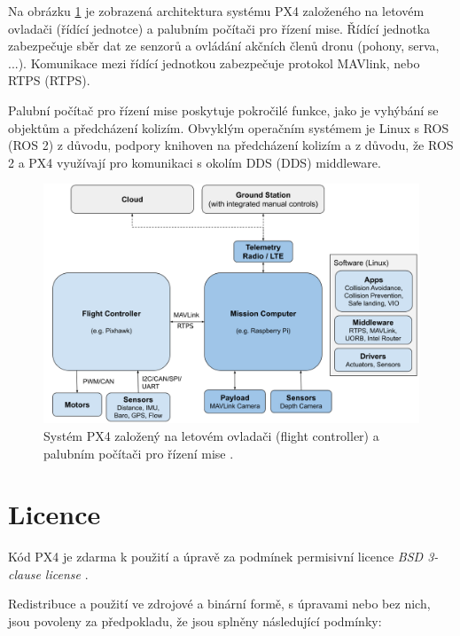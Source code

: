 Na obrázku \ref{fig:PX4_FC_PC} je zobrazená architektura systému PX4 založeného na letovém ovladači (řídící jednotce) a palubním počítači pro řízení mise. Řídící jednotka zabezpečuje sběr dat ze senzorů a ovládání akčních členů dronu (pohony, serva, ...). Komunikace mezi řídící jednotkou zabezpečuje protokol MAVlink, nebo \acs{RTPS} (\acl{RTPS}).

Palubní počítač pro řízení mise poskytuje pokročilé funkce, jako je vyhýbání se objektům a předcházení kolizím. Obvyklým operačním systémem je Linux s ROS (ROS 2) z důvodu, podpory knihoven na předcházení kolizím a z důvodu, že ROS 2 a PX4 využívají pro komunikaci s okolím \acs{DDS} (\acl{DDS}) middleware.

\begin{figure}[!ht]
    \begin{center}
        \includegraphics[scale=0.37]{obrazky/PX43}
    \end{center}
    \caption[Systém PX4 založený na letovém ovladači (flight controller) a palubním počítači pro řízení mise]{Systém PX4 založený na letovém ovladači (flight controller) a palubním počítači pro řízení mise \cite{PX4main2}.}
    \label{fig:PX4_FC_PC}
\end{figure}

\section{Licence}

Kód PX4 je zdarma k použití a úpravě za podmínek permisivní licence \textit{BSD 3-clause license} \cite{BSDlicense}.

Redistribuce a použití ve zdrojové a binární formě, s úpravami nebo bez nich, jsou povoleny za předpokladu, že jsou splněny následující podmínky:

